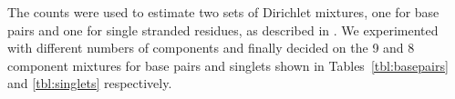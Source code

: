 \documentclass[11pt]{article}
\newif\ifdraft
\begin{document}
The counts were used to estimate two sets of Dirichlet mixtures, one
for base pairs and one for single stranded residues, as
described in \cite{Sjolander96}.
We experimented with different numbers of components and finally
decided on the 9 and 8 component mixtures for base pairs and singlets
shown in Tables~\ref{tbl:basepairs} and \ref{tbl:singlets} respectively.

%
%
\ifdraft
\end{document}
